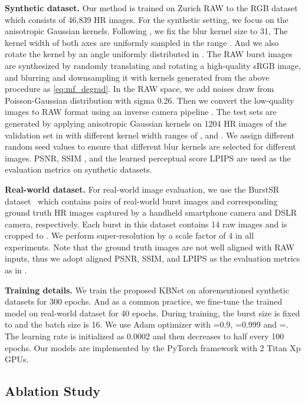 \noindent \textbf{Synthetic dataset.}
Our method is trained on Zurich RAW to the RGB dataset \cite{ignatov2020replacing} which consists of 46,839 HR images. For the synthetic setting, we focus on the anisotropic Gaussian kernels. Following \cite{bell2019blind}, we fix the blur kernel size to 31, The kernel width of both axes are uniformly sampled in the range . And we also rotate the kernel by an angle uniformly distributed in . The RAW burst images are synthesized by randomly translating and rotating a high-quality sRGB image, and blurring and downsampling it with kernels generated from the above procedure as \cref{eq:mf_degrad}. In the RAW space, we add noises draw from Poisson-Gaussian distribution with sigma 0.26. Then we convert the low-quality images to RAW format using an inverse camera pipeline \cite{brooks2019unprocessing}. The test sets are generated by applying anisotropic Gaussian kernels on 1204 HR images of the validation set in \cite{ignatov2020replacing} with different kernel width ranges of ,  and . We assign different random seed values to ensure that different blur kernels are selected for different images. PSNR, SSIM \cite{wang2004image}, and the learned perceptual score LPIPS \cite{zhang2018unreasonable} are used as the evaluation metrics on synthetic datasets.


\noindent \textbf{Real-world dataset.}
For real-world image evaluation, we use the BurstSR dataset~\cite{bhat2021deep} which contains pairs of real-world burst images and corresponding ground truth HR images captured by a handheld smartphone camera and DSLR camera, respectively. Each burst in this dataset contains 14 raw images and is cropped to .
We perform super-resolution by a scale factor of 4 in all experiments. Note that the ground truth images are not well aligned with RAW inputs, thus we adopt aligned PSNR, SSIM, and LPIPS as the evaluation metrics as in \cite{bhat2021deep}.

\noindent \textbf{Training details.}
We train the proposed KBNet on aforementioned synthetic datasets for 300 epochs. And as a common practice, we fine-tune the trained model on real-world dataset for 40 epochs. During training, the burst size is fixed to  and the batch size is 16. We use Adam \cite{kingma2014adam} optimizer with =0.9, =0.999 and =. The learning rate is initialized as 0.0002 and then decreases to half every 100 epochs. Our models are implemented by the PyTorch framework with 2 Titan Xp GPUs. 


\subsection{Ablation Study}

